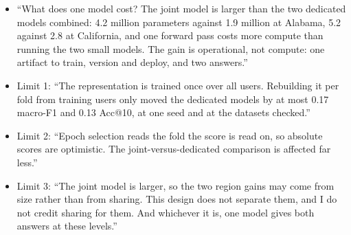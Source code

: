 \say
\begin{itemize}
  \item ``What does one model cost? The joint model is larger than the two dedicated models combined:
        4.2 million parameters against 1.9 million at Alabama, 5.2 against 2.8 at California, and one
        forward pass costs more compute than running the two small models. The gain is operational, not
        compute: one artifact to train, version and deploy, and two answers.''
  \item Limit 1: ``The representation is trained once over all users. Rebuilding it per fold from
        training users only moved the dedicated models by at most 0.17 macro-F1 and 0.13 Acc@10, at one
        seed and at the datasets checked.''
  \item Limit 2: ``Epoch selection reads the fold the score is read on, so absolute scores are
        optimistic. The joint-versus-dedicated comparison is affected far less.''
  \item Limit 3: ``The joint model is larger, so the two region gains may come from size rather than
        from sharing. This design does not separate them, and I do not credit sharing for them. And
        whichever it is, one model gives both answers at these levels.''
\end{itemize}

